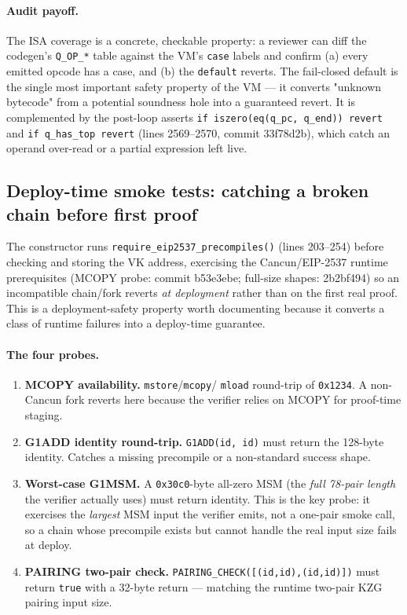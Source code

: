 \paragraph{Audit payoff.} The ISA coverage is a concrete, checkable
property: a reviewer can diff the codegen's \texttt{Q\_OP\_*} table
against the VM's \texttt{case} labels and confirm (a) every emitted
opcode has a case, and (b) the \texttt{default} reverts. The
fail-closed default is the single most important safety property of
the VM --- it converts "unknown bytecode" from a potential soundness
hole into a guaranteed revert. It is complemented by the post-loop
asserts \texttt{if iszero(eq(q\_\allowbreak{}pc, q\_\allowbreak{}end)) revert} and
\texttt{if q\_\allowbreak{}has\_\allowbreak{}top revert} (lines 2569--2570, commit 33f78d2b),
which catch an operand over-read or a partial expression left live.

\subsection{Deploy-time smoke tests: catching a broken chain before first proof}
\label{sec:pr-smoke}

The constructor runs \texttt{require\_\allowbreak{}eip2537\_\allowbreak{}precompiles()} (lines
203--254) before checking and storing the VK address, exercising the
Cancun/EIP-2537 runtime prerequisites (MCOPY probe: commit b53e3ebe;
full-size shapes: 2b2bf494) so an
incompatible chain/fork reverts \emph{at deployment} rather than on
the first real proof. This is a deployment-safety property worth
documenting because it converts a class of runtime failures into a
deploy-time guarantee.

\paragraph{The four probes.}
\begin{enumerate}[leftmargin=1.5em,itemsep=2pt]
  \item \textbf{MCOPY availability.} \texttt{mstore}/\texttt{mcopy}/
        \texttt{mload} round-trip of \texttt{0x1234}. A non-Cancun
        fork reverts here because the verifier relies on MCOPY for
        proof-time staging.
  \item \textbf{G1ADD identity round-trip.}
        \texttt{G1ADD(id, id)} must return the 128-byte identity.
        Catches a missing precompile or a non-standard success shape.
  \item \textbf{Worst-case G1MSM.} A \texttt{0x30c0}-byte all-zero
        MSM (the \emph{full 78-pair length} the verifier actually
        uses) must return identity. This is the key probe: it
        exercises the \emph{largest} MSM input the verifier emits,
        not a one-pair smoke call, so a chain whose precompile exists
        but cannot handle the real input size fails at deploy.
  \item \textbf{PAIRING two-pair check.}
        \texttt{PAIRING\_\allowbreak{}CHECK([(id,id),(id,id)])} must return
        \texttt{true} with a 32-byte return --- matching the runtime
        two-pair KZG pairing input size.
\end{enumerate}

